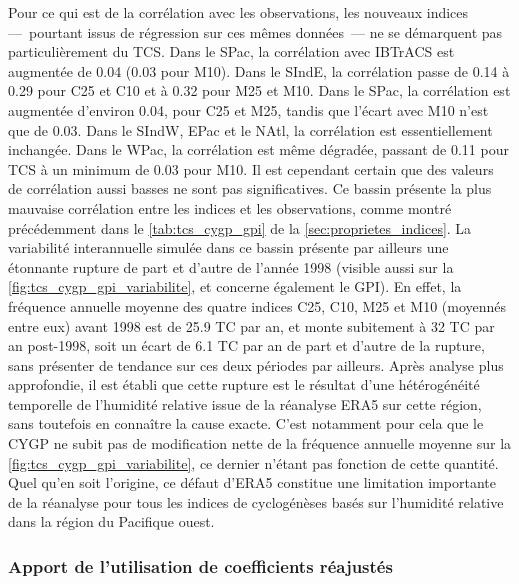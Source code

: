 \documentclass[../main.tex]{subfiles}
\begin{document}
Pour ce qui est de la corrélation avec les observations, les nouveaux indices ---~pourtant issus de régression sur ces mêmes données~--- ne se démarquent pas
particulièrement du TCS. Dans le SPac, la corrélation avec IBTrACS est augmentée de \num{0.04} (\num{0.03} pour M10). Dans le SIndE, la corrélation passe de
\num{0.14} à \num{0.29} pour C25 et C10 et à \num{0.32} pour M25 et M10. Dans le SPac, la corrélation est augmentée d'environ \num{0.04}, pour C25 et M25,
tandis que l'écart avec M10 n'est que de \num{0.03}. Dans le SIndW, EPac et le NAtl, la corrélation est essentiellement inchangée. Dans le WPac, la corrélation
est même dégradée, passant de \num{0.11} pour TCS à un minimum de \num{0.03} pour M10. Il est cependant certain que des valeurs de corrélation aussi basses ne
sont pas significatives. Ce bassin présente la plus mauvaise corrélation entre les indices et les observations, comme montré précédemment dans le
\cref{tab:tcs_cygp_gpi} de la \cref{sec:proprietes_indices}. La variabilité interannuelle simulée dans ce bassin présente par ailleurs une étonnante rupture de
part et d'autre de l'année \num{1998} (visible aussi sur la \cref{fig:tcs_cygp_gpi_variabilite}, et concerne également le GPI). En effet, la fréquence annuelle
moyenne des quatre indices C25, C10, M25 et M10 (moyennés entre eux) avant 1998 est de \num{25.9} TC par an, et monte subitement à \num{32} TC par an
post-\num{1998}, soit un écart de \num{6.1} TC par an de part et d'autre de la rupture, sans présenter de tendance sur ces deux périodes par ailleurs. Après
analyse plus approfondie, il est établi que cette rupture est le résultat d'une hétérogénéité temporelle de l'humidité relative issue de la réanalyse ERA5 sur
cette région, sans toutefois en connaître la cause exacte. C'est notamment pour cela que le CYGP ne subit pas de modification nette de la fréquence annuelle
moyenne sur la \cref{fig:tcs_cygp_gpi_variabilite}, ce dernier n'étant pas fonction de cette quantité. Quel qu'en soit l'origine, ce défaut d'ERA5 constitue une
limitation importante de la réanalyse pour tous les indices de cyclogénèses basés sur l'humidité relative dans la région du Pacifique ouest.

\subsubsection{Apport de l'utilisation de coefficients réajustés}\label{sec:diagnostique_rang}
\end{document}

